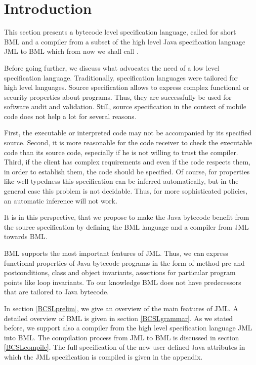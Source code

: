 
%

\newcommand{\code}{\textit{code}}
\newcommand{\indexComp}{\textit{index}}





\section{Introduction} \label{bcsl}
This section presents a bytecode level specification language, called for short BML and a compiler from a
 subset of the high level Java specification language JML to BML which from now we shall call \JMLtoBML. 


 Before going further, we discuss what advocates the need of a low level specification language.
Traditionally, specification languages were tailored for high level languages.  
Source  specification allows to express complex functional or security properties about programs.
Thus, they are successfully be used 
for software audit and validation. Still, source specification in the context of mobile code does not help a lot for several reasons.


First, the executable or interpreted code  may not be accompanied by its specified  source. Second, it is more reasonable for the 
code receiver to check the executable code than its source code, especially if he is not willing to trust the compiler. 
Third, if the client has complex requirements and even if the code respects them, in order to establish them, 
the code should be specified. Of course, for properties like well typedness this specification can be inferred automatically,
but in the general case this problem is not decidable. 
Thus, for more sophisticated policies, an automatic inference will not work.

 It is in this perspective, that we propose to make the Java
bytecode benefit from the source specification by defining the BML language and a compiler from JML towards BML.    

 BML supports the most important features of JML. Thus, we can express functional properties of Java
 bytecode programs in the form of method pre and postconditions, class and object invariants, assertions
 for particular program points like loop invariants. To our knowledge BML does not have predecessors that are tailored 
 to Java bytecode.  

 In section \ref{BCSLprelim}, we give an overview of the main features of JML. A detailed overview of BML is given in section \ref{BCSLgrammar}.  
  As we stated before, we support also a compiler from the high level specification language JML into BML. The 
 compilation process from JML to BML is discussed in section  \ref{BCSLcompile}.
 The full specification of the new user defined Java attributes in which the JML specification is compiled is given in the appendix.




